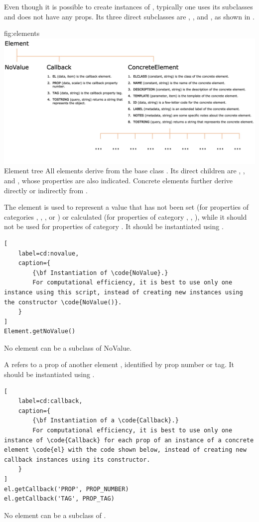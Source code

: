 \documentclass{tufte-handout}
\begin{document}
Even though it is possible to create instances of , typically one uses its subclasses and does not have any props.
Its three direct subclasses are , , and , as shown in .

	{fig:elements}
	{\includegraphics{fig01_big.jpg}}
	{Element tree}
	{
	All elements derive from the base class . 
	Its direct children are , , and , whose properties are also indicated.
	Concrete elements further derive directly or indirectly from .
	}

The element  is used to represent a value that has not been set (for properties of categories , , ,  or ) or calculated (for properties of category , , ), while it should not be used for properties of category .
It should be instantiated using .
%
\begin{lstlisting}[
	label=cd:novalue,
	caption={
		{\bf Instantiation of \code{NoValue}.}
		For computational efficiency, it is best to use only one instance using this script, instead of creating new instances using the constructor \code{NoValue()}. 
	}
]
Element.getNoValue()
\end{lstlisting}
%
No element can be a subclass of NoValue.
  
A  refers to a prop of another element , identified by prop number or tag.
It should be instantiated using .
%
\begin{lstlisting}[
	label=cd:callback,
	caption={
		{\bf Instantiation of a \code{Callback}.}
		For computational efficiency, it is best to use only one instance of \code{Callback} for each prop of an instance of a concrete element \code{el} with the code shown below, instead of creating new callback instances using its constructor. 
	}
]
el.getCallback('PROP', PROP_NUMBER)
el.getCallback('TAG', PROP_TAG)
\end{lstlisting}
%
No element can be a subclass of .
\end{document}
